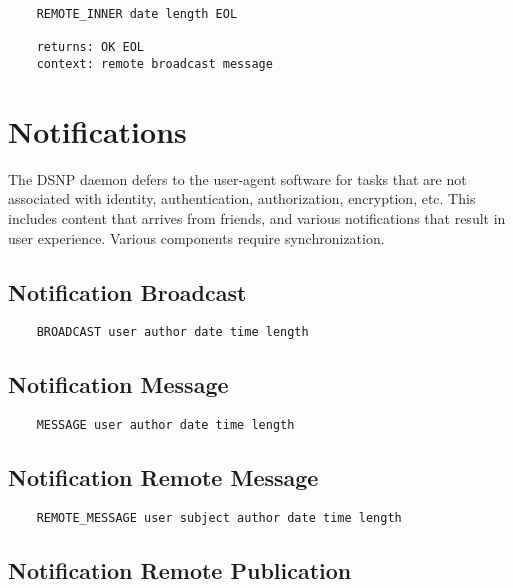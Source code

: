 \documentclass[letterpaper,11pt,oneside]{article}
\begin{document}
\vspace{10pt}
\begin{verbatim}
    REMOTE_INNER date length EOL

    returns: OK EOL
    context: remote broadcast message
\end{verbatim}

\section{Notifications}

The DSNP daemon defers to the user-agent software for tasks that are not
associated with identity, authentication, authorization, encryption, etc. This
includes content that arrives from friends, and various notifications that
result in user experience. Various components require synchronization.

\subsection{Notification Broadcast}

\vspace{10pt}
\begin{verbatim}
    BROADCAST user author date time length 
\end{verbatim}
\vspace{10pt}

\subsection{Notification Message}

\vspace{10pt}
\begin{verbatim}
    MESSAGE user author date time length 
\end{verbatim}
\vspace{10pt}

\subsection{Notification Remote Message}

\vspace{10pt}
\begin{verbatim}
    REMOTE_MESSAGE user subject author date time length 
\end{verbatim}
\vspace{10pt}

\subsection{Notification Remote Publication}
\end{document}
